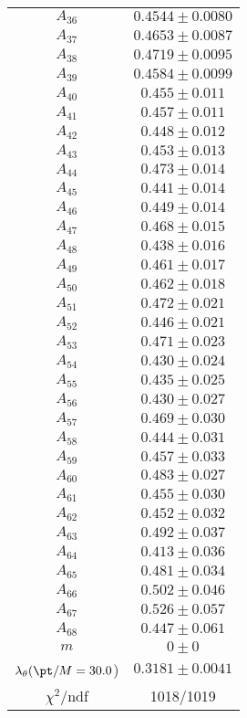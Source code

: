 \begin{tabular}{c|c}
$A_{36}$ & $0.4544\pm0.0080$ \\
$A_{37}$ & $0.4653\pm0.0087$ \\
$A_{38}$ & $0.4719\pm0.0095$ \\
$A_{39}$ & $0.4584\pm0.0099$ \\
$A_{40}$ & $0.455\pm0.011$ \\
$A_{41}$ & $0.457\pm0.011$ \\
$A_{42}$ & $0.448\pm0.012$ \\
$A_{43}$ & $0.453\pm0.013$ \\
$A_{44}$ & $0.473\pm0.014$ \\
$A_{45}$ & $0.441\pm0.014$ \\
$A_{46}$ & $0.449\pm0.014$ \\
$A_{47}$ & $0.468\pm0.015$ \\
$A_{48}$ & $0.438\pm0.016$ \\
$A_{49}$ & $0.461\pm0.017$ \\
$A_{50}$ & $0.462\pm0.018$ \\
$A_{51}$ & $0.472\pm0.021$ \\
$A_{52}$ & $0.446\pm0.021$ \\
$A_{53}$ & $0.471\pm0.023$ \\
$A_{54}$ & $0.430\pm0.024$ \\
$A_{55}$ & $0.435\pm0.025$ \\
$A_{56}$ & $0.430\pm0.027$ \\
$A_{57}$ & $0.469\pm0.030$ \\
$A_{58}$ & $0.444\pm0.031$ \\
$A_{59}$ & $0.457\pm0.033$ \\
$A_{60}$ & $0.483\pm0.027$ \\
$A_{61}$ & $0.455\pm0.030$ \\
$A_{62}$ & $0.452\pm0.032$ \\
$A_{63}$ & $0.492\pm0.037$ \\
$A_{64}$ & $0.413\pm0.036$ \\
$A_{65}$ & $0.481\pm0.034$ \\
$A_{66}$ & $0.502\pm0.046$ \\
$A_{67}$ & $0.526\pm0.057$ \\
$A_{68}$ & $0.447\pm0.061$ \\
$m$ & $0\pm0$ \\
$\lambda_\theta(\pt/M = 30.0$) & $0.3181\pm0.0041$ \\
\hline
$\chi^2$/ndf & 1018/1019
\end{tabular}
